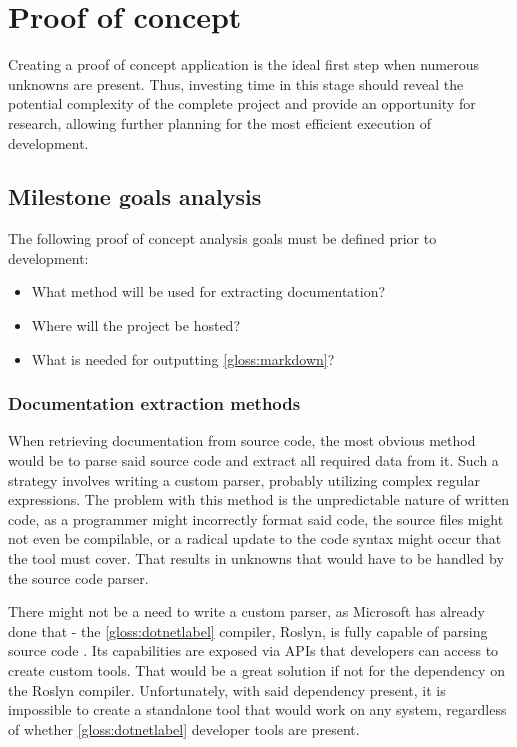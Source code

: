 \chapter{Proof of concept} \label{chap:proofConcept}

Creating a proof of concept application is the ideal first step when numerous unknowns are present. Thus, investing time in this stage should reveal the potential complexity of the complete project and provide an opportunity for research, allowing further planning for the most efficient execution of development.

\section{Milestone goals analysis}

The following proof of concept analysis goals must be defined prior to development:
\begin{itemize}
    \item What method will be used for extracting documentation?
    \item Where will the project be hosted?
    \item What is needed for outputting \ref{gloss:markdown}?
\end{itemize}

\subsection{Documentation extraction methods}
When retrieving documentation from source code, the most obvious method would be to parse said source code and extract all required data from it. Such a strategy involves writing a custom parser, probably utilizing complex regular expressions. The problem with this method is the unpredictable nature of written code, as a programmer might incorrectly format said code, the source files might not even be compilable, or a radical update to the code syntax might occur that the tool must cover. That results in unknowns that would have to be handled by the source code parser.

There might not be a need to write a custom parser, as Microsoft has already done that - the \ref{gloss:dotnetlabel} compiler, Roslyn, is fully capable of parsing source code \cite{wagner_get_2021}. Its capabilities are exposed via APIs that developers can access to create custom tools. That would be a great solution if not for the dependency on the Roslyn compiler. Unfortunately, with said dependency present, it is impossible to create a standalone tool that would work on any system, regardless of whether \ref{gloss:dotnetlabel} developer tools are present.

